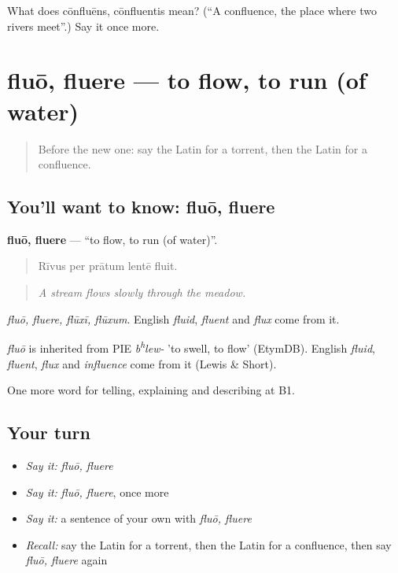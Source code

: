 \begin{tcolorbox}[breakable,colback=teal!4,colframe=teal!35!black,title={Before you move on}]
What does cōnfluēns, cōnfluentis mean? (\textquotedblleft{}A confluence, the place where two rivers meet\textquotedblright{}.) Say it once more.
\end{tcolorbox}
\section[fluō, fluere]{fluō, fluere — to flow, to run (of water)}

\label{lesson:LA-C482-fluo}



\begin{quote}
Before the new one: say the Latin for a torrent, then the Latin for a confluence.
\end{quote}

\subsection*{You'll want to know: fluō, fluere}
\textbf{fluō, fluere} — \textquotedblleft{}to flow, to run (of water)\textquotedblright{}.

\begin{quote}
Rīvus per prātum lentē fluit.
\end{quote}

\begin{quote}
\emph{A stream flows slowly through the meadow.}
\end{quote}

\emph{fluō, fluere, flūxī, flūxum}. English \emph{fluid}, \emph{fluent} and \emph{flux} come from it.

\begin{cousinweb}
\emph{fluō} is inherited from PIE \emph{b\textsuperscript{h}lew-} 'to swell, to flow' (EtymDB). English \emph{fluid}, \emph{fluent}, \emph{flux} and \emph{influence} come from it (Lewis \& Short).
\end{cousinweb}

\begin{grammarlens}[title={What you've built}]
One more word for telling, explaining and describing at B1.
\end{grammarlens}

\subsection*{Your turn}
\begin{itemize}
\raggedright
  \item \emph{Say it:} \emph{fluō, fluere}
  \item \emph{Say it:} \emph{fluō, fluere}, once more
  \item \emph{Say it:} a sentence of your own with \emph{fluō, fluere}
  \item \emph{Recall:} say the Latin for a torrent, then the Latin for a confluence, then say \emph{fluō, fluere} again
\end{itemize}

